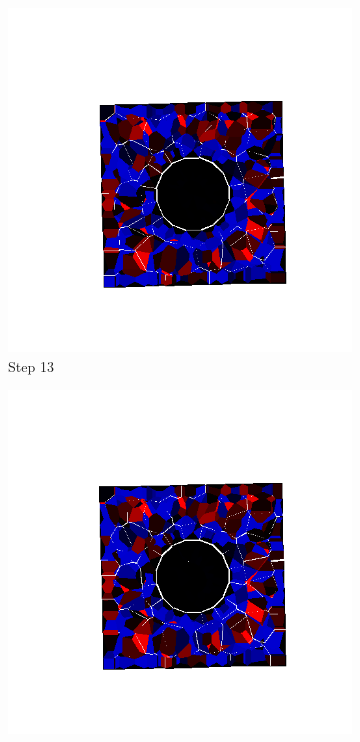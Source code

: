 \begin{figure}[ht!]
      \begin{subfigure}{.25\textwidth}
        \centering
        \includegraphics[width=1.0\linewidth]{Files/Small_DEF/IS/DEP5-STEP(013).png}
      \caption{Step 13}
      \end{subfigure}%
      \begin{subfigure}{.25\textwidth}
        \centering
        \includegraphics[width=1.0\linewidth]{Files/Small_DEF/IS/DEP5-STEP(014).png}

\end{subfigure}
\end{figure}
